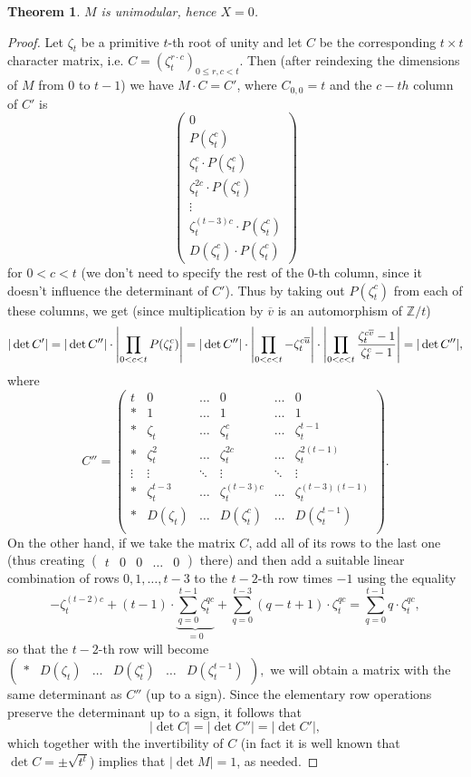 \documentclass[12pt,a4paper]{article}
\newtheorem{theorem}{Theorem}
\newcommand{\Z}{\mathbb{Z}}
\newcommand{\zt}{\zeta_t}
\newcommand{\uo}{\overline{u}}
\newcommand{\vo}{\overline{v}}
\DeclarePairedDelimiter\abs{\lvert}{\rvert}
\begin{document}
\begin{theorem}
$M$ is unimodular, hence $X=0$.
\end{theorem}
\begin{proof}
Let $\zt$ be a primitive $t$-th root of unity and let $C$ be the corresponding $t\times t$ character matrix, i.e. $C=(\zt^{r\cdot c})_{0\leq r,c<t}$. Then (after reindexing the dimensions of $M$ from $0$ to $t-1$) we have $M\cdot C=C'$, where $C_{0,0}=t$ and the $c-th$ column of $C'$ is
$$
\begin{pmatrix}
0\\ 
P(\zt^c) \\ 
\zt^c \cdot P(\zt^c) \\ 
\zt^{2c} \cdot P(\zt^c) \\ 
\vdots\\ 
\zt^{(t-3)c} \cdot P(\zt^c) \\ 
D(\zt^c) \cdot P(\zt^c)
\end{pmatrix}
$$
for $0<c<t$ (we don't need to specify the rest of the $0$-th column, since it doesn't influence the determinant of $C'$). Thus by taking out $P(\zt^c)$ from each of these columns, we get  (since multiplication by $\vo$ is an automorphism of $\Z/t$)
$$|\det C'|=|\det C''|\cdot\abs*{\prod_{0<c<t}P(\zt^c)}=|\det C''|\cdot\abs*{\prod_{0<c<t}-\zt^{c\uo}}\cdot\abs*{\prod_{0<c<t}\frac{\zt^{c\vo}-1}{\zt^c-1}}=|\det C''|,$$
where
$$C''=
\begin{pmatrix}
t& 0& \dots & 0 & \dots & 0\\ 
*& 1& \dots & 1 & \dots & 1\\ 
*& \zt& \dots & \zt^c & \dots & \zt^{t-1}\\ 
*& \zt^2& \dots & \zt^{2c} & \dots & \zt^{2(t-1)}\\ 
\vdots& \vdots&\ddots  & \vdots & \ddots & \vdots\\ 
*& \zt^{t-3}& \dots & \zt^{(t-3)c} & \dots & \zt^{(t-3)(t-1)}\\ 
*& D(\zt)& \dots & D(\zt^c) & \dots & D(\zt^{t-1})\\ 
\end{pmatrix}.
$$
On the other hand, if we take the matrix $C$, add all of its rows to the last one (thus creating $\begin{pmatrix}
t & 0 & 0& \dots &0
\end{pmatrix}$
there) and then add a suitable linear combination of rows $0,1,\dots, t-3$ to the $t-2$-th row times $-1$ using the equality
$$-\zt^{(t-2)c}+(t-1)\cdot\underbrace{\sum_{q=0}^{t-1}\zt^{qc}}_{=0}+\sum_{q=0}^{t-3}(q-t+1)\cdot\zt^{qc}=\sum_{q=0}^{t-1}q\cdot\zt^{qc},$$
so that the $t-2$-th row will become
$\begin{pmatrix}
*& D(\zt)& \dots & D(\zt^c) & \dots & D(\zt^{t-1})
\end{pmatrix},$
we will obtain a matrix with the same determinant as $C''$ (up to a sign). Since the elementary row operations preserve the determinant up to a sign, it follows that
$$|\det C|=|\det C''|=|\det C'|,$$ which together with the invertibility of $C$ (in fact it is well known that $\det C=\pm \sqrt{t^t}$) implies that $|\det M|=1$, as needed.
\end{proof}
\end{document}
